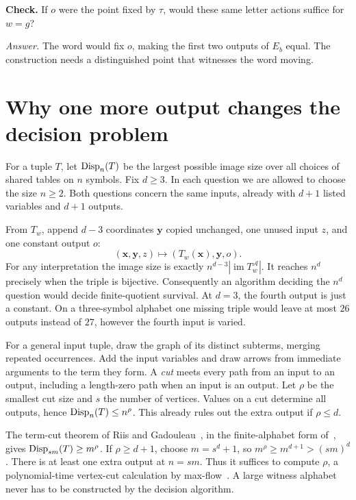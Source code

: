 \documentclass[a4paper,12pt]{article}
\newcommand{\fA}{\mathcal A}
\newcommand{\stephead}[1]{\par\smallskip{\large\bfseries\color{inkblue}#1}\par\nobreak}
\newcommand{\checkit}[1]{\par\smallskip\textbf{Check.} #1}
\newcommand{\answer}[1]{\par\textit{Answer.} #1}
\begin{document}
\checkit{If \(o\) were the point fixed by \(\tau\), would these same letter actions suffice for \(w=g\)?}
\answer{The word would fix \(o\), making the first two outputs of \(E_b\) equal. The construction needs a distinguished point that witnesses the word moving.}
\newpage
\section{Why one more output changes the decision problem}\label{gap}
For a tuple \(T\), let \(\mathrm{Disp}_n(T)\) be the largest possible image size over all choices of shared tables on \(n\) symbols. Fix \(d\ge3\). In each question we are allowed to choose the size \(n\ge2\). Both questions concern the same inputs, already with \(d+1\) listed variables and \(d+1\) outputs.

\stephead{At the threshold \(n^d\)}
From \(T_w\), append \(d-3\) coordinates \(\mathbf y\) copied unchanged, one unused input \(z\), and one constant output \(o\):
\[
 (\mathbf x,\mathbf y,z)\longmapsto(T_w(\mathbf x),\mathbf y,o).
\]
For any interpretation the image size is exactly \(n^{d-3}|\operatorname{im}T_w^\fA|\). It reaches \(n^d\) precisely when the triple is bijective. Consequently an algorithm deciding the \(n^d\) question would decide finite-quotient survival. At \(d=3\), the fourth output is just a constant. On a three-symbol alphabet one missing triple would leave at most \(26\) outputs instead of \(27\), however the fourth input is varied.

\stephead{At the threshold \(n^d+1\)}
For a general input tuple, draw the graph of its distinct subterms, merging repeated occurrences. Add the input variables and draw arrows from immediate arguments to the term they form. A \emph{cut} meets every path from an input to an output, including a length-zero path when an input is an output. Let \(\rho\) be the smallest cut size and \(s\) the number of vertices. Values on a cut determine all outputs, hence \(\mathrm{Disp}_n(T)\le n^\rho\). This already rules out the extra output if \(\rho\le d\).

The term-cut theorem of Riis and Gadouleau~\cite{RG}, in the finite-alphabet form of~\cite[Theorem~5.5(b)]{TC}, gives \(\mathrm{Disp}_{sm}(T)\ge m^\rho\). If \(\rho\ge d+1\), choose \(m=s^d+1\), so \(m^\rho\ge m^{d+1}>(sm)^d\). There is at least one extra output at \(n=sm\). Thus it suffices to compute \(\rho\), a polynomial-time vertex-cut calculation by max-flow~\cite[\S5.5]{TC}. A large witness alphabet never has to be constructed by the decision algorithm.
\end{document}
